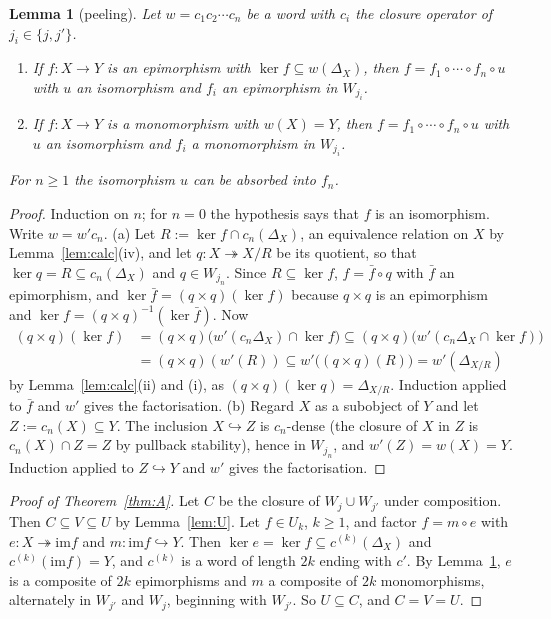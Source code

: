 \documentclass[11pt]{amsart}
\newtheorem{lem}[thm]{Lemma}
\theoremstyle{definition}
\newcommand{\im}{\mathrm{im}}
\begin{document}
\begin{lem}[peeling]\label{lem:peel}
Let $w=c_1c_2\cdots c_n$ be a word with $c_i$ the closure operator of
$j_i\in\{j,j'\}$.
\begin{enumerate}
\item[(a)] If $f\colon X\to Y$ is an epimorphism with $\ker f\subseteq
w(\Delta_X)$, then $f=f_1\circ\cdots\circ f_n\circ u$ with $u$ an
isomorphism and $f_i$ an epimorphism in $W_{j_i}$.
\item[(b)] If $f\colon X\to Y$ is a monomorphism with $w(X)=Y$, then
$f=f_1\circ\cdots\circ f_n\circ u$ with $u$ an isomorphism and $f_i$ a
monomorphism in $W_{j_i}$.
\end{enumerate}
For $n\ge1$ the isomorphism $u$ can be absorbed into $f_n$.
\end{lem}
\begin{proof}
Induction on $n$; for $n=0$ the hypothesis says that $f$ is an isomorphism.
Write $w=w'c_n$.
(a) Let $R:=\ker f\cap c_n(\Delta_X)$, an equivalence relation on $X$ by
Lemma~\ref{lem:calc}(iv), and let $q\colon X\twoheadrightarrow X/R$ be its
quotient, so that $\ker q=R\subseteq c_n(\Delta_X)$ and $q\in W_{j_n}$. Since
$R\subseteq\ker f$, $f=\bar f\circ q$ with $\bar f$ an epimorphism, and
$\ker\bar f=(q\times q)(\ker f)$ because $q\times q$ is an epimorphism and
$\ker f=(q\times q)^{-1}(\ker\bar f)$. Now
\begin{align*}
(q\times q)(\ker f)&=(q\times q)\bigl(w'(c_n\Delta_X)\cap\ker f\bigr)
\subseteq(q\times q)\bigl(w'(c_n\Delta_X\cap\ker f)\bigr)\\
&=(q\times q)(w'(R))\subseteq w'\bigl((q\times q)(R)\bigr)=w'(\Delta_{X/R})
\end{align*}
by Lemma~\ref{lem:calc}(ii) and (i), as $(q\times q)(\ker q)=\Delta_{X/R}$.
Induction applied to $\bar f$ and $w'$ gives the factorisation.
(b) Regard $X$ as a subobject of $Y$ and let $Z:=c_n(X)\subseteq Y$. The
inclusion $X\hookrightarrow Z$ is $c_n$-dense (the closure of $X$ in $Z$ is
$c_n(X)\cap Z=Z$ by pullback stability), hence in $W_{j_n}$, and
$w'(Z)=w(X)=Y$. Induction applied to $Z\hookrightarrow Y$ and $w'$ gives the
factorisation.
\end{proof}

\begin{proof}[Proof of Theorem~\ref{thm:A}]
Let $C$ be the closure of $W_j\cup W_{j'}$ under composition. Then
$C\subseteq V\subseteq U$ by Lemma~\ref{lem:U}. Let $f\in U_k$, $k\ge1$, and
factor $f=m\circ e$ with $e\colon X\twoheadrightarrow\im f$ and $m\colon\im f
\hookrightarrow Y$. Then $\ker e=\ker f\subseteq c^{(k)}(\Delta_X)$ and
$c^{(k)}(\im f)=Y$, and $c^{(k)}$ is a word of length $2k$ ending with $c'$.
By Lemma~\ref{lem:peel}, $e$ is a composite of $2k$ epimorphisms and $m$ a
composite of $2k$ monomorphisms, alternately in $W_{j'}$ and $W_j$,
beginning with $W_{j'}$. So $U\subseteq C$, and $C=V=U$.
\end{proof}
\end{document}
